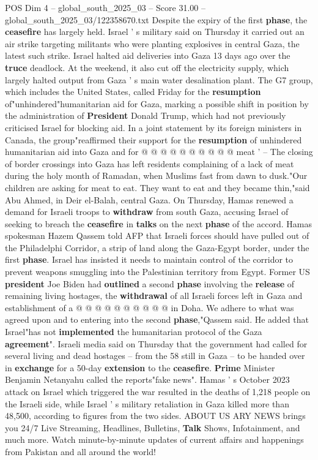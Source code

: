 \begin{textsample}{POS Dim 4 – global\_south\_2025\_03 – Score 31.00 – global\_south\_2025\_03/122358670.txt}
Despite the expiry of the first \textbf{phase}, the \textbf{ceasefire} has largely held.
Israel ' s military said on Thursday it carried out an air strike targeting militants who were planting explosives in central Gaza, the latest such strike.
Israel halted aid deliveries into Gaza 13 days ago over the \textbf{truce} deadlock.
At the weekend, it also cut off the electricity supply, which largely halted output from Gaza ' s main water desalination plant.
The G7 group, which includes the United States, called Friday for the \textbf{resumption} of"unhindered"humanitarian aid for Gaza, marking a possible shift in position by the administration of \textbf{President} Donald Trump, which had not previously criticised Israel for blocking aid.
In a joint statement by its foreign ministers in Canada, the group"reaffirmed their support for the \textbf{resumption} of unhindered humanitarian aid into Gaza and for @ @ @ @ @ @ @ @ @ @ meat ' -- The closing of border crossings into Gaza has left residents complaining of a lack of meat during the holy month of Ramadan, when Muslims fast from dawn to dusk."Our children are asking for meat to eat.
They want to eat and they became thin,"said Abu Ahmed, in Deir el-Balah, central Gaza.
On Thursday, Hamas renewed a demand for Israeli troops to \textbf{withdraw} from south Gaza, accusing Israel of seeking to breach the \textbf{ceasefire} in \textbf{talks} on the next \textbf{phase} of the accord.
Hamas spokesman Hazem Qassem told AFP that Israeli forces should have pulled out of the Philadelphi Corridor, a strip of land along the Gaza-Egypt border, under the first \textbf{phase}.
Israel has insisted it needs to maintain control of the corridor to prevent weapons smuggling into the Palestinian territory from Egypt.
Former US \textbf{president} Joe Biden had \textbf{outlined} a second \textbf{phase} involving the \textbf{release} of remaining living hostages, the \textbf{withdrawal} of all Israeli forces left in Gaza and establishment of a @ @ @ @ @ @ @ @ @ @ in Doha.
We adhere to what was agreed upon and to entering into the second \textbf{phase},"Qassem said.
He added that Israel"has not \textbf{implemented} the humanitarian protocol of the Gaza \textbf{agreement}".
Israeli media said on Thursday that the government had called for several living and dead hostages -- from the 58 still in Gaza -- to be handed over in \textbf{exchange} for a 50-day \textbf{extension} to the \textbf{ceasefire}. \textbf{Prime} Minister Benjamin Netanyahu called the reports"fake news".
Hamas ' s October 2023 attack on Israel which triggered the war resulted in the deaths of 1,218 people on the Israeli side, while Israel ' s military retaliation in Gaza killed more than 48,500, according to figures from the two sides.
ABOUT US ARY NEWS brings you 24/7 Live Streaming, Headlines, Bulletins, \textbf{Talk} Shows, Infotainment, and much more.
Watch minute-by-minute updates of current affairs and happenings from Pakistan and all around the world!


\end{textsample}
